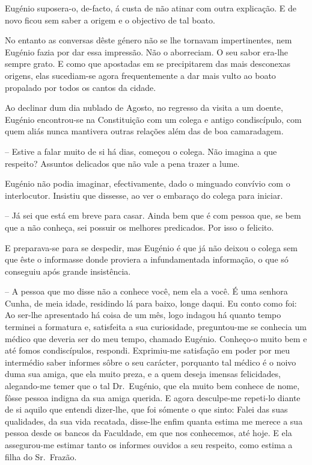 \documentclass[9pt]{article}
\begin{document}
Eugé\-nio suposera-o, de-facto, á custa de não atinar com outra expli\-ca\-ção. E de novo ficou sem saber a origem e o objectivo de tal boato.

No entanto as conversas dêste género não se lhe tornavam impertinentes,
nem Eugé\-nio fazia por dar essa impressão. Não o aborreciam. O seu sabor
era-\-lhe sempre grato. E como que apostadas em se precipitarem das mais desconexas origens, elas sucediam-se agora frequentemente a dar mais vulto ao
boato propalado por todos os cantos da cidade.

Ao declinar dum dia nublado de Agosto, no regresso da visita a um doente, Eugé\-nio encontrou-se na Constitui\-ção com um colega e antigo condiscípulo,
com quem aliás nunca mantivera outras rela\-ções além das de boa camaradagem.

-- Estive a falar muito de si há dias, começou o colega. Não imagina a
que respeito? Assuntos delicados que não vale a pena trazer a lume.

Eugé\-nio não podia imaginar, efectivamente, dado o minguado con\-ví\-vio com
o interlocutor. Insistiu que dissesse, ao ver o embaraço do colega para iniciar.

-- Já sei que está em breve para casar. Ainda bem que é com pessoa que,
se bem que a não conheça, sei possuir os me\-lhores predicados. Por isso o felicito.

E preparava-se para se despedir, mas Eugé\-nio é que já não deixou o colega sem que êste o informasse donde proviera a infundamentada informa\-ção,
o que só conseguiu após gran\-de insistência.

-- A pessoa que mo disse não a conhece você, nem ela a você. É uma senhora Cunha, de meia idade, residindo lá para baixo, longe daqui. Eu conto como
foi: Ao ser-\-lhe apresentado há coisa de um mês, logo indagou há quanto tempo
terminei a formatura e, satisfeita a sua curiosidade, preguntou-me se conhecia um médico que deveria ser do meu tempo, chamado Eugé\-nio. Conheço-o muito bem e até fomos condiscípulos, respondi. Exprimiu-me satisfa\-ção em poder
por meu intermédio saber informes sôbre o seu carácter, porquanto tal médico
é o noivo duma sua amiga, que ela muito preza, e a quem deseja imensas felicidades, alegando-me temer que o tal Dr.\ Eugé\-nio, que ela muito bem conhece
de nome, fôsse pessoa indigna da sua amiga querida. E agora desculpe-me repeti-lo diante de si aquilo que entendi di\-\mbox{zer-lhe}, que foi sómente o que %
sinto: Falei das suas qualidades, da sua vida recatada, disse-lhe enfim
quanta estima me merece a sua pessoa desde os bancos da Faculdade, em que
nos conhecemos, até hoje. E ela assegurou-me estimar tanto os informes ouvidos a seu respeito, como estima a fi\-lha do Sr.\ Frazão.
\end{document}

